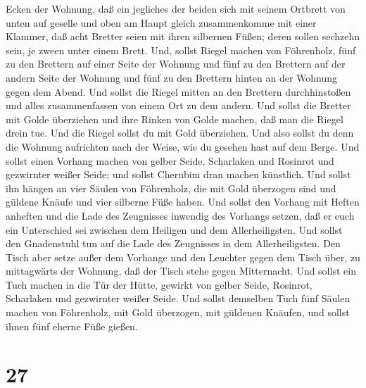 Ecken der Wohnung,  daß ein jegliches der beiden sich mit
seinem Ortbrett von unten auf geselle und oben am Haupt gleich
zusammenkomme mit einer Klammer,  daß acht Bretter seien
mit ihren silbernen Füßen; deren sollen sechzehn sein, je zween unter
einem Brett.  Und, sollst Riegel machen von Föhrenholz,
fünf zu den Brettern auf einer Seite der Wohnung  und fünf
zu den Brettern auf der andern Seite der Wohnung und fünf zu den
Brettern hinten an der Wohnung gegen dem Abend.  Und sollst
die Riegel mitten an den Brettern durchhinstoßen und alles
zusammenfassen von einem Ort zu dem andern.  Und sollst die
Bretter mit Golde überziehen und ihre Rinken von Golde machen, daß man
die Riegel drein tue.  Und die Riegel sollst du mit Gold
überziehen. Und also sollst du denn die Wohnung aufrichten nach der
Weise, wie du gesehen hast auf dem Berge.  Und sollst einen
Vorhang machen von gelber Seide, Scharlaken und Rosinrot und gezwirnter
weißer Seide; und sollst Cherubim dran machen künstlich. 
Und sollst ihn hängen an vier Säulen von Föhrenholz, die mit Gold
überzogen sind und güldene Knäufe und vier silberne Füße haben.
 Und sollst den Vorhang mit Heften anheften und die Lade
des Zeugnisses inwendig des Vorhangs setzen, daß er euch ein Unterschied
sei zwischen dem Heiligen und dem Allerheiligsten.  Und
sollst den Gnadenstuhl tun auf die Lade des Zeugnisses in dem
Allerheiligsten.  Den Tisch aber setze außer dem Vorhange
und den Leuchter gegen dem Tisch über, zu mittagwärts der Wohnung, daß
der Tisch stehe gegen Mitternacht.  Und sollst ein Tuch
machen in die Tür der Hütte, gewirkt von gelber Seide, Rosinrot,
Scharlaken und gezwirnter weißer Seide.  Und sollst
demselben Tuch fünf Säulen machen von Föhrenholz, mit Gold überzogen,
mit güldenen Knäufen, und sollst ihnen fünf eherne Füße gießen.

\hypertarget{section-26}{%
\section{27}\label{section-26}}

